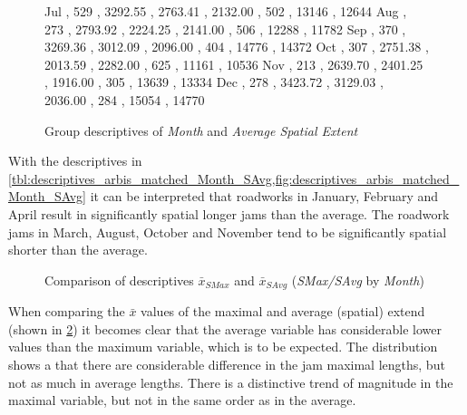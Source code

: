 \begin{figure}[ht!]
\begin{minipage}{0.55\textwidth}
{			Jul , 529 , 3292.55 , 2763.41 , 2132.00 , 502 , 13146 , 12644
			Aug , 273 , 2793.92 , 2224.25 , 2141.00 , 506 , 12288 , 11782
			Sep , 370 , 3269.36 , 3012.09 , 2096.00 , 404 , 14776 , 14372
			Oct , 307 , 2751.38 , 2013.59 , 2282.00 , 625 , 11161 , 10536
			Nov , 213 , 2639.70 , 2401.25 , 1916.00 , 305 , 13639 , 13334
			Dec , 278 , 3423.72 , 3129.03 , 2036.00 , 284 , 15054 , 14770
		}\data		
		\pgfplotstablesort[sort key=mean, sort cmp=float >]{\datasorted}{\data}
		\tiny
		\centering
		\label{fig:descriptives_arbis_matched_Month_SAvg}
	\end{minipage}%
	\caption{Group descriptives of \textit{Month} and \textit{Average Spatial Extent}}
\end{figure}
With the descriptives in \cref{tbl:descriptives_arbis_matched_Month_SAvg,fig:descriptives_arbis_matched_Month_SAvg} it can be interpreted that roadworks in January, February and April result in significantly spatial longer jams than the average. The roadwork jams in March, August, October and November tend to be significantly spatial shorter than the average.
\begin{figure}[ht!]
	\data
	\pgfplotstablesort[sort key=meanSAvg, sort cmp=float >]{\datasorted}{\data}
	\tiny
	\centering
	\caption{Comparison of descriptives $\bar{x}_{SMax}$ and $\bar{x}_{SAvg}$ (\textit{SMax/SAvg} by \textit{Month})}
	\label{fig:arbis_matched_meancomparison_month_spatial}
\end{figure}
When comparing the $\bar{x}$ values of the maximal and average (spatial) extend (shown in \cref{fig:arbis_matched_meancomparison_month_spatial}) it becomes clear that the average variable has considerable lower values than the maximum variable, which is to be expected. The distribution shows a that there are considerable difference in the jam maximal lengths, but not as much in average lengths. There is a distinctive trend of magnitude in the maximal variable, but not in the same order as in the average. 


